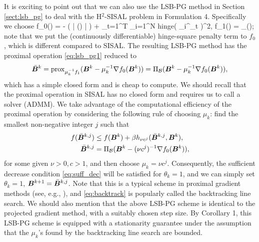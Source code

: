 \documentclass[10pt,twocolumn,twoside]{IEEEtran}
\begin{document}
It is exciting to point out that we can also use the LSB-PG method in Section \ref{sect:lsb_pg} to deal with the H$^2$-SISAL problem in Formulation 4.
Specifically we choose
\beq \label{eq:f0_h2_sisal}
f_0(\bB) = - \log ( | \det(\bB) | ) + \textstyle \lambda \sum_{t=1}^T \sum_{i=1}^N {\rm hinge}( \bb_i^\top \by_t )^2, \quad f_1(\bB) = \textstyle  {}_\setB(\bB);
\eeq
note that we put the (continuously differentiable) hinge-square penalty term to $f_0$, which is different compared to  SISAL.
The resulting LSB-PG method has the proximal operation \eqref{eq:lsb_pg1} reduced to
\[
\bar{{\bm B}}^k = {\rm prox}_{\mu_k^{-1} f_1}( {\bm B}^k - \mu_k^{-1} \nabla f_0({\bm B}^k) ) = \Pi_{\mathcal{B}}( {\bm B}^k - \mu_k^{-1} \nabla f_0({\bm B}^k) ),
\]
which has a simple closed form and is cheap to compute.
We should recall that the proximal operation in SISAL has no closed form and requires us to call a solver (ADMM).
We take advantage of the computational efficiency of the proximal operation by considering the following rule of choosing $\mu_k$:
find the smallest non-negative integer $j$ such that
\begin{subequations} \label{eq:backtrack}
	\begin{align}
	f(\bar{{\bm B}}^{k,j}) & \leq f({\bm B}^k) + \beta h_{\nu c^j}( \bar{{\bm B}}^{k,j}, {\bm B}^k), \\
	\bar{{\bm B}}^{k,j} & = \Pi_{\mathcal{B}}( {\bm B}^k - (\nu c^j)^{-1} \nabla f_0({\bm B}^k) ),
	\end{align}
\end{subequations}
for some given $\nu > 0, c > 1$, and then choose $\mu_k = \nu c^j$.
Consequently, the sufficient decrease condition \eqref{eq:suff_dec} will be satisfied for $\theta_k = 1$, and we can simply set $\theta_k = 1$, ${\bm B}^{k+1} = \bar{{\bm B}}^{k,j}$.
Note that this is a typical scheme in proximal gradient methods  (see, e.g., \cite{beck2017first}), and \eqref{eq:backtrack} is popularly called the backtracking line search.
We should also mention that the above LSB-PG scheme is identical to the projected gradient method, with a suitably chosen step size.
By Corollary 1,
this LSB-PG scheme is equipped with a stationarity guarantee under the assumption that the $\mu_k$'s found by the backtracking line search are bounded.
\end{document}
